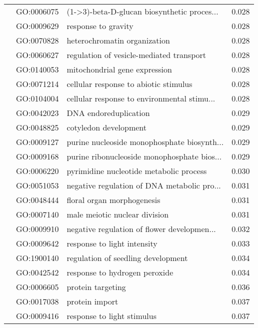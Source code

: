 \begin{longtable}{lllr}
   & GO:0006075 &  (1->3)-beta-D-glucan biosynthetic proces... &         0.028 \\
   & GO:0009629 &                          response to gravity &         0.028 \\
   & GO:0070828 &                 heterochromatin organization &         0.028 \\
   & GO:0060627 &     regulation of vesicle-mediated transport &         0.028 \\
   & GO:0140053 &                mitochondrial gene expression &         0.028 \\
   & GO:0071214 &        cellular response to abiotic stimulus &         0.028 \\
   & GO:0104004 &  cellular response to environmental stimu... &         0.028 \\
   & GO:0042023 &                        DNA endoreduplication &         0.029 \\
   & GO:0048825 &                        cotyledon development &         0.029 \\
   & GO:0009127 &  purine nucleoside monophosphate biosynth... &         0.029 \\
   & GO:0009168 &  purine ribonucleoside monophosphate bios... &         0.029 \\
   & GO:0006220 &      pyrimidine nucleotide metabolic process &         0.030 \\
   & GO:0051053 &  negative regulation of DNA metabolic pro... &         0.031 \\
   & GO:0048444 &                   floral organ morphogenesis &         0.031 \\
   & GO:0007140 &                male meiotic nuclear division &         0.031 \\
   & GO:0009910 &  negative regulation of flower developmen... &         0.032 \\
   & GO:0009642 &                  response to light intensity &         0.033 \\
   & GO:1900140 &           regulation of seedling development &         0.034 \\
   & GO:0042542 &                response to hydrogen peroxide &         0.034 \\
   & GO:0006605 &                            protein targeting &         0.036 \\
   & GO:0017038 &                               protein import &         0.037 \\
   & GO:0009416 &                   response to light stimulus &         0.037 \\

\end{longtable}
